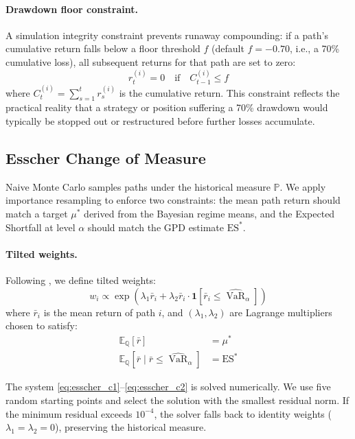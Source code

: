 \documentclass[12pt]{article}
\newcommand{\E}{\mathbb{E}}
\newcommand{\P}{\mathbb{P}}
\newcommand{\Q}{\mathbb{Q}}
\newcommand{\var}{\operatorname{VaR}}
\begin{document}
\paragraph{Drawdown floor constraint.}
A simulation integrity constraint prevents runaway compounding: if a path's cumulative
return falls below a floor threshold $f$ (default $f = -0.70$, i.e., a 70\% cumulative
loss), all subsequent returns for that path are set to zero:
\begin{equation}
  r_t^{(i)} = 0 \quad \text{if} \quad C_{t-1}^{(i)} \leq f
\end{equation}
where $C_t^{(i)} = \sum_{s=1}^{t} r_s^{(i)}$ is the cumulative return. This constraint
reflects the practical reality that a strategy or position suffering a 70\% drawdown
would typically be stopped out or restructured before further losses accumulate.

\subsection{Esscher Change of Measure}

Naive Monte Carlo samples paths under the historical measure $\P$. We apply importance
resampling to enforce two constraints: the mean path return should match a target
$\mu^*$ derived from the Bayesian regime means, and the Expected Shortfall at level
$\alpha$ should match the GPD estimate $\text{ES}^*$.

\paragraph{Tilted weights.}
Following \citet{gerbershiu1994}, we define tilted weights:
\begin{equation}
  w_i \propto \exp\!\left(\lambda_1 \bar{r}_i
    + \lambda_2 \bar{r}_i \cdot \mathbf{1}[\bar{r}_i \leq \widehat{\var}_\alpha]\right)
  \label{eq:esscher_weights}
\end{equation}
where $\bar{r}_i$ is the mean return of path $i$, and $(\lambda_1, \lambda_2)$
are Lagrange multipliers chosen to satisfy:
\begin{align}
  \E_\Q[\bar{r}] &= \mu^*
  \label{eq:esscher_c1} \\
  \E_\Q[\bar{r} \mid \bar{r} \leq \widehat{\var}_\alpha] &= \text{ES}^*
  \label{eq:esscher_c2}
\end{align}

The system \eqref{eq:esscher_c1}--\eqref{eq:esscher_c2} is solved numerically.
We use five random starting points and select the solution with the smallest
residual norm. If the minimum residual exceeds $10^{-4}$, the solver falls back
to identity weights ($\lambda_1 = \lambda_2 = 0$), preserving the historical measure.
\end{document}
